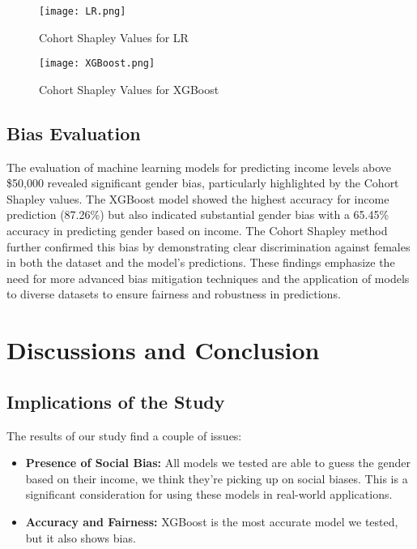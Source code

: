 \documentclass[conference]{IEEEtran}
\begin{document}
\begin{figure}[h]

    \centering
    \texttt{[image: LR.png]}
    \caption{Cohort Shapley Values for LR} 
    \label{fig:shap_lr} 
\end{figure}

\begin{figure}[h]
    \centering
    \texttt{[image: XGBoost.png]}
    \caption{Cohort Shapley Values for XGBoost} 
    \label{fig:shap_xgb} 
\end{figure}


\subsection{Bias Evaluation}
The evaluation of machine learning models for predicting income levels above \$50,000 revealed significant gender bias, particularly highlighted by the Cohort Shapley values. The XGBoost model showed the highest accuracy for income prediction (87.26\%) but also indicated substantial gender bias with a 65.45\% accuracy in predicting gender based on income. The Cohort Shapley method further confirmed this bias by demonstrating clear discrimination against females in both the dataset and the model's predictions. These findings emphasize the need for more advanced bias mitigation techniques and the application of models to diverse datasets to ensure fairness and robustness in predictions.
\section{Discussions and Conclusion}

\subsection{Implications of the Study}
The results of our study find a couple of issues:
\begin{itemize}
    \item \textbf{Presence of Social Bias:} All models we tested are able to guess the gender based on their income, we think they're picking up on social biases. This is a significant consideration for using these models in real-world applications.
    
    \item \textbf{Accuracy and Fairness:}  XGBoost is the most accurate model we tested, but it also shows bias. 
\end{itemize}
\end{document}
